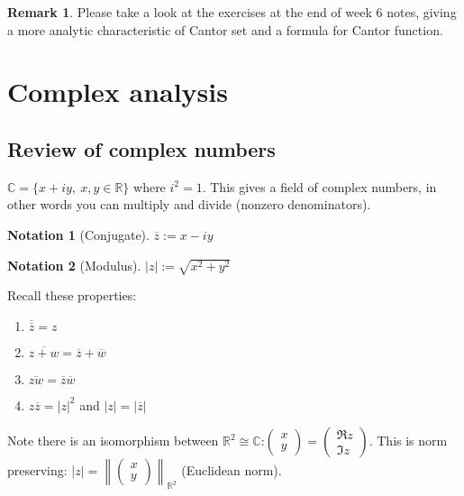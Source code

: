 \documentclass[a4paper]{article}
\theoremstyle{definition}
\newtheorem*{remark}{Remark}
\newtheorem*{notation}{Notation}
\begin{document}
\begin{remark}
Please take a look at the exercises at the end of week 6 notes, giving a more analytic characteristic of Cantor set and a formula for Cantor function.
\end{remark}

\section{Complex analysis}
\subsection{Review of complex numbers}
$\mathbb C = \{x+iy,\ x,y\in \mathbb R\}$ where $i^2=1$. This gives a field of complex numbers, in other words you can multiply and divide (nonzero denominators).

\begin{center}
\end{center}

\begin{notation}[Conjugate]
$\overline{z}:=x-iy$
\end{notation}
\begin{notation}[Modulus]
$|z|:=\sqrt{x^2+y^2}$
\end{notation}

Recall these properties:
\begin{enumerate}
    \item $\overline{\overline{z}}=z$
    \item $\overline{z+w}=\overline{z}+\overline{w}$
    \item $\overline{zw}=\overline{z}\overline{w}$
    \item $z\overline{z}=|z|^2$ and $|z|=|\overline{z}|$
\end{enumerate}

Note there is an isomorphism between $\mathbb R^2 \cong \mathbb C$:$\begin{pmatrix}x\\y\end{pmatrix}=\begin{pmatrix}\Re z \\ \Im z \end{pmatrix}$. This is norm preserving: $|z| = \left\| \begin{pmatrix}x\\y\end{pmatrix} \right\|_{\mathbb R^2}$ (Euclidean norm).
\end{document}
